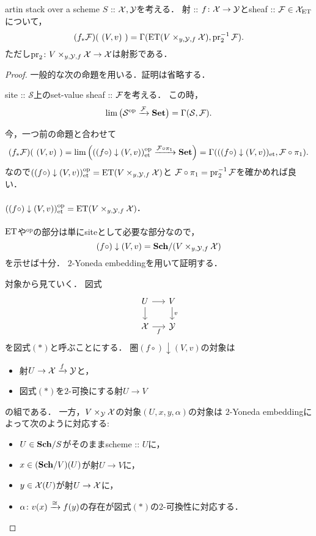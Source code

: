 \begin{Prop}[\cite{SP} 06WS]
    artin stack over a scheme $S$ :: $\mathcal{X}, \mathcal{Y}$を考える．
    射 :: $f \colon \mathcal{X} \to \mathcal{Y}$とsheaf :: $\mathcal{F} \in \mathcal{X}_{\mathrm{ET}}$について，
    \[ (f_*\mathcal{F})(\ (V, v)\ )=\Gamma( \mathrm{ET}(V \times_{y, \mathcal{Y}, f} \mathcal{X}), \operatorname{pr}_2^{-1} \mathcal{F}  ). \]
    ただし$\operatorname{pr}_2 \colon V \times_{y, \mathcal{Y}, f} \mathcal{X} \to \mathcal{X}$は射影である．
\end{Prop}
\begin{proof}
    一般的な次の命題を用いる．証明は省略する．
    \begin{Lemma}
        site :: $\mathcal{S}$上のset-value sheaf :: $\mathcal{F}$を考える．
        この時，
        \[ \operatorname*{lim} \big( \mathcal{S}^{\mathrm{op}} \xrightarrow{\mathcal{F}} \mathbf{Set} \big)=\Gamma( \mathcal{S}, \mathcal{F}). \]
    \end{Lemma}
    
    今，一つ前の命題と合わせて
    \[
        (f_*\shF)(\ (V, v)\ )
        =\Lim\Big( ((f \circ) \downarrow (V,v))_{\et}^{\mathrm{op}} \xto{\shF \circ \pi_1} \Set \Big)
        =\Gamma( ((f \circ) \downarrow (V,v))_{\et}, \shF \circ \pi_1).
    \]
    なので$((f \circ) \downarrow (V,v))_{\mathrm{et}}^{\mathrm{op}}=\mathrm{ET}(V \times_{y, \mathcal{Y}, f} \mathcal{X})$と
    $\mathcal{F} \circ \pi_1=\operatorname{pr}_2^{-1}\mathcal{F}$を確かめれば良い．

    \paragraph{$((f \circ) \downarrow (V,v))_{\mathrm{et}}^{\mathrm{op}}=\mathrm{ET}(V \times_{y, \mathcal{Y}, f} \mathcal{X})$.}
    $\mathrm{ET}$や${}^{\mathrm{op}}$の部分は単にsiteとして必要な部分なので，
    \[ (f \circ) \downarrow (V,v)=\mathbf{Sch}/(V \times_{y, \mathcal{Y}, f} \mathcal{X}) \]
    を示せば十分．
    $2$-Yoneda embeddingを用いて証明する．

    対象から見ていく．
    図式
    \[
        \begin{tikzcd}[sep=15pt]
            U \ar[r]\ar[d]& V \ar[d, "v"]\\
            \stX \ar[r, "f"']& \stY
        \end{tikzcd}
    \]
    を図式$(*)$と呼ぶことにする．
    圏$(f \circ) \downarrow (V,v)$の対象は
    \begin{itemize}
        \item 射$U \to \mathcal{X} \xrightarrow{f} \mathcal{Y}$と，
        \item 図式$(*)$を$2$-可換にする射$U \to V$
    \end{itemize}
    の組である．
    一方，$V \times_{\mathcal{Y}} \mathcal{X}$の対象$(U, x, y, \alpha)$の対象は
    $2$-Yoneda embeddingによって次のように対応する:
    \begin{itemize}
        \item $U \in \mathbf{Sch}/S$がそのままscheme :: $U$に，
        \item $x \in (\mathbf{Sch}/V)(U)$が射$U \to V$に，
        \item $y \in \mathcal{X}(U)$が射$U \to \mathcal{X}$に，
        \item $\alpha \colon v(x) \xrightarrow{\cong} f(y)$の存在が図式$(*)$の$2$-可換性に対応する．
    \end{itemize}


\end{proof}
